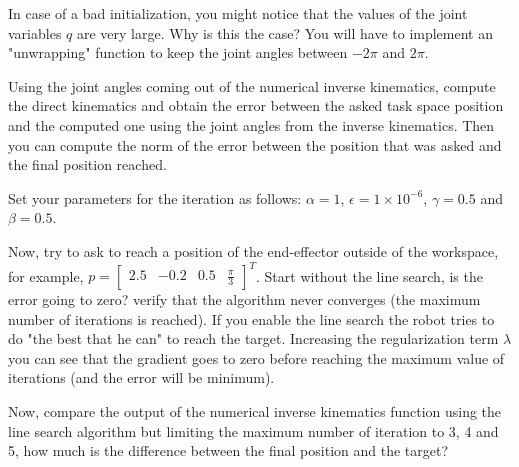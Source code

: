 \documentclass[11pt]{article}
\newcommand{\mat}[1]{\ensuremath{\begin{bmatrix}#1\end{bmatrix}}}	%
\begin{document}
In case of a bad initialization, you might notice that the values of the joint variables $q$ are very large. Why is this the case? You will have to implement an "unwrapping" function to keep the joint angles between $-2\pi$ and $2\pi$. 
 
Using the joint angles coming out of the numerical inverse kinematics, compute the direct kinematics and obtain the error between the asked task space position and the computed one using the joint angles from the inverse kinematics.  
Then you  can compute the norm of the error between the position that was asked and the final position reached.
 
 
Set your parameters for the iteration as follows: $\alpha = 1$, $\epsilon = 1 \times 10^{-6}$, $\gamma = 0.5$ and $\beta = 0.5$. 

Now, try to ask to reach a position of the end-effector outside of the workspace, for example, $p = \mat{	2.5 & -0.2 & 0.5 & \frac{\pi}{3}}^T$. Start without the line search, is the error going to zero? verify that the algorithm never converges (the maximum number of iterations is reached). If you enable the line search the robot tries to do "the best that he can" to reach the target. Increasing the regularization term $\lambda$ you can see that the gradient goes to zero before reaching the maximum value of iterations (and the error will be minimum).



Now,  compare the output of the numerical inverse kinematics function  using the line search algorithm but limiting the maximum number of iteration to 3, 4 and 5, how much is the difference between the final position and the target? 

\end{document}
